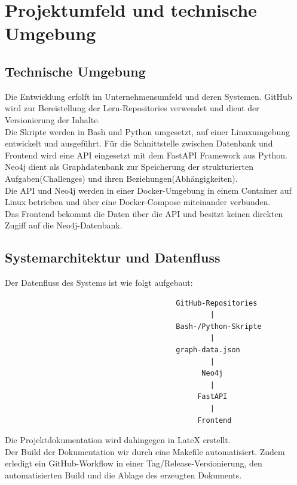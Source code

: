 \section{Projektumfeld und technische Umgebung}

\subsection{Technische Umgebung}

Die Entwicklung erfolft im Unternehmensumfeld und deren Systemen.
GitHub wird zur Bereistellung der Lern-Repositories verwendet und dient der Versionierung der Inhalte.
\\
Die Skripte werden in Bash und Python umgesetzt, auf einer Linuxumgebung entwickelt und ausgeführt.
Für die Schnittstelle zwischen Datenbank und Frontend wird eine API eingesetzt mit dem FastAPI Framework aus Python.
\\
Neo4j dient als Graphdatenbank zur Speicherung der strukturierten Aufgaben(Challenges) und ihren Beziehungen(Abhängigkeiten).
\\
Die API und Neo4j werden in einer Docker-Umgebung in einem Container auf Linux betrieben und über eine Docker-Compose miteinander verbunden.
\\
Das Frontend bekommt die Daten über die API und besitzt keinen direkten Zugiff auf die Neo4j-Datenbank.

\subsection{Systemarchitektur und Datenfluss}

Der Datenfluss des Systems ist wie folgt aufgebaut:
{\footnotesize
\begin{verbatim}
                                        GitHub-Repositories
                                                |
                                        Bash-/Python-Skripte
                                                |
                                        graph-data.json
                                                |
                                              Neo4j
                                                |
                                             FastAPI
                                                |
                                             Frontend
\end{verbatim}
}
Die Projektdokumentation wird dahingegen in LateX erstellt.
\\
Der Build der Dokumentation wir durch eine Makefile automatisiert.
Zudem erledigt ein GitHub-Workflow in einer Tag/Release-Versionierung, den automatisierten Build und die Ablage des erzeugten Dokuments.
